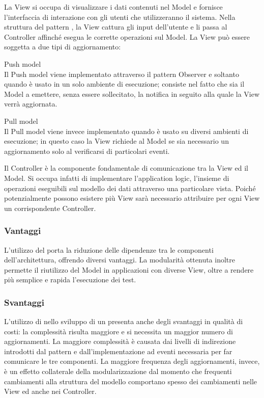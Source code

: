 \documentclass[a4paper, titlepage]{article}
\begin{document}
La View si occupa di visualizzare i dati contenuti nel Model e fornisce l’interfaccia di interazione con gli utenti che utilizzeranno il sistema.
Nella struttura del pattern , la View cattura gli input dell’utente e li passa al Controller affinché esegua le corrette operazioni sul Model.
\newline La View può essere soggetta a due tipi di aggiornamento:
\begin{description}
\item{Push model} 
\\Il Push model viene implementato attraverso il pattern Observer e soltanto quando  è usato in un solo ambiente di esecuzione; consiste nel fatto che sia il Model a emettere, senza essere sollecitato, la notifica in seguito alla quale la View verrà aggiornata.
\item{Pull model}
\\Il Pull model viene invece implementato quando  è usato su diversi ambienti di esecuzione; in questo caso la View richiede al Model se sia necessario un aggiornamento solo al verificarsi di particolari eventi.
\end{description}

Il Controller è la componente fondamentale di comunicazione tra la View ed il Model. Si occupa infatti di implementare l’application logic, l’insieme di operazioni eseguibili sul modello dei dati attraverso una particolare vista.
\newline Poiché potenzialmente possono esistere più View sarà necessario attribuire per ogni View un corrispondente Controller.

\subsubsection{Vantaggi}
L'utilizzo del   porta la riduzione delle dipendenze tra le componenti dell'architettura, offrendo diversi vantaggi. La modularità ottenuta inoltre permette il riutilizzo del Model in applicazioni con diverse View, oltre a rendere più semplice e rapida l’esecuzione dei test.

\subsubsection{Svantaggi}
L’utilizzo di  nello sviluppo di un  presenta anche degli svantaggi in qualità di costi: la complessità risulta maggiore e si necessita un maggior  numero di aggiornamenti.
\newline La maggiore complessità è causata dai livelli di indirezione introdotti dal pattern e dall’implementazione ad eventi necessaria per far comunicare le tre componenti.
\newline La maggiore frequenza degli aggiornamenti, invece, è un effetto collaterale della modularizzazione dal momento che frequenti cambiamenti alla struttura del modello comportano spesso dei cambiamenti nelle View ed anche nei Controller.
\end{document}
